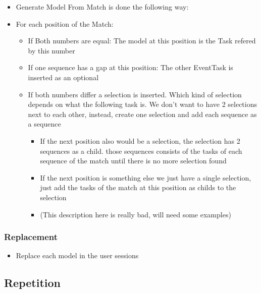 	\begin{itemize}
		\item Generate Model From Match is done the following way:
		\item For each position of the Match: 
		\begin{itemize}
			\item If Both numbers are equal: The model at this position is the Task refered by this number
			\item If one sequence has a gap at this position: The other EventTask is inserted as an optional
			\item If both numbers differ a selection is inserted. Which kind of selection depends on what the following task is. We don't want to have 2 selections next to each other, instead, create one selection and add each sequence as a sequence
			\begin{itemize}
				\item If the next position also would be a selection, the selection has 2 sequences as a child. those sequences consists of the tasks of each sequence of the match until there is no more selection found 
				\item If the next position is something else we just have a single selection, just add the tasks of the match at this position as childs to the selection
				\item (This description here is really bad, will need some examples)
			\end{itemize}
		\end{itemize}
	\end{itemize}

\subsubsection{Replacement}
	\begin{itemize}
		\item Replace each model in the user sessions
	\end{itemize}

\subsection{Repetition}




